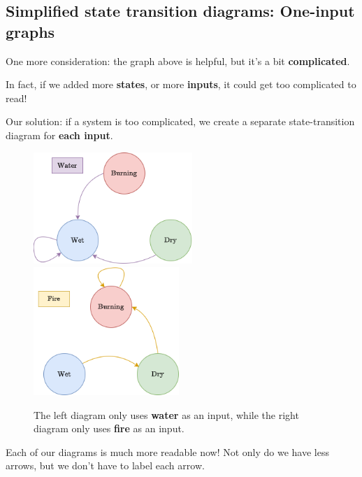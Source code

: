 



    \phantom{}

    \subsection{Simplified state transition diagrams: One-input graphs}
        
        One more consideration: the graph above is helpful, but it's a bit \textbf{complicated}. 
        
        In fact, if we added more \textbf{states}, or more \textbf{inputs}, it could get too complicated to read!
        
        Our solution: if a system is too complicated, we create a separate state-transition diagram for \textbf{each input}.
        
        \begin{figure}[H]
            \centering
            \includegraphics[width=60mm,scale=0.4]{images/rnn_images/std_water_no_label.png}
            \qquad
            \includegraphics[width=55mm,scale=0.4]{images/rnn_images/std_fire.png}
            
            \caption*{The left diagram only uses \textbf{water} as an input, while the right diagram only uses \textbf{fire} as an input.}
        \end{figure}
        
        Each of our diagrams is much more readable now! Not only do we have less arrows, but we don't have to label each arrow.
        
